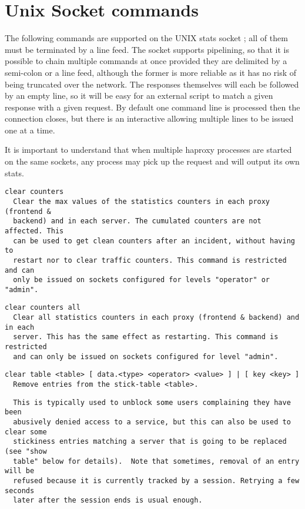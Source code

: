 
\section{Unix Socket commands}

The following commands are supported on the UNIX stats socket ; all of them
must be terminated by a line feed. The socket supports pipelining, so that it
is possible to chain multiple commands at once provided they are delimited by
a semi-colon or a line feed, although the former is more reliable as it has no
risk of being truncated over the network. The responses themselves will each be
followed by an empty line, so it will be easy for an external script to match a
given response with a given request. By default one command line is processed
then the connection closes, but there is an interactive allowing multiple lines
to be issued one at a time.


It is important to understand that when multiple haproxy processes are started
on the same sockets, any process may pick up the request and will output its
own stats.

\begin{verbatim}
clear counters
  Clear the max values of the statistics counters in each proxy (frontend &
  backend) and in each server. The cumulated counters are not affected. This
  can be used to get clean counters after an incident, without having to
  restart nor to clear traffic counters. This command is restricted and can
  only be issued on sockets configured for levels "operator" or "admin".
\end{verbatim}

\begin{verbatim}
clear counters all
  Clear all statistics counters in each proxy (frontend & backend) and in each
  server. This has the same effect as restarting. This command is restricted
  and can only be issued on sockets configured for level "admin".
\end{verbatim}

\begin{verbatim}
clear table <table> [ data.<type> <operator> <value> ] | [ key <key> ]
  Remove entries from the stick-table <table>.
\end{verbatim}

\begin{verbatim}
  This is typically used to unblock some users complaining they have been
  abusively denied access to a service, but this can also be used to clear some
  stickiness entries matching a server that is going to be replaced (see "show
  table" below for details).  Note that sometimes, removal of an entry will be
  refused because it is currently tracked by a session. Retrying a few seconds
  later after the session ends is usual enough.
\end{verbatim}

